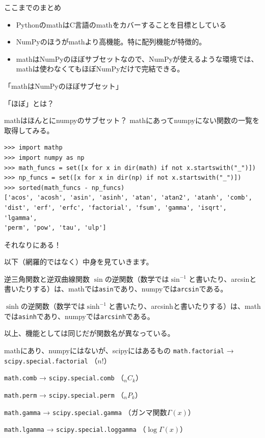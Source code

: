 \documentclass[unicode,lualatex,aspectratio=169]{beamer}
\begin{document}
\begin{frame}[fragile]{ここまでのまとめ}
  \begin{itemize}
  \item PythonのmathはC言語のmathをカバーすることを目標としている
  \item NumPyのほうがmathより高機能。特に配列機能が特徴的。
  \item mathはNumPyのほぼサブセットなので、NumPyが使えるような環境では、mathは使わなくてもほぼNumPyだけで完結できる。
  \end{itemize}
\end{frame}
\begin{frame}
  「mathはNumPyのほぼサブセット」

  
  「ほぼ」とは？
\end{frame}
\begin{frame}[fragile]{mathはほんとにnumpyのサブセット？}
mathにあってnumpyにない関数の一覧を取得してみる。
{\fontsize{6pt}{6pt}\selectfont    
\begin{verbatim}
>>> import mathp
>>> import numpy as np
>>> math_funcs = set([x for x in dir(math) if not x.startswith("_")])
>>> np_funcs = set([x for x in dir(np) if not x.startswith("_")])
>>> sorted(math_funcs - np_funcs)
['acos', 'acosh', 'asin', 'asinh', 'atan', 'atan2', 'atanh', 'comb', 
'dist', 'erf', 'erfc', 'factorial', 'fsum', 'gamma', 'isqrt', 'lgamma',
'perm', 'pow', 'tau', 'ulp']
\end{verbatim}
}
それなりにある！

以下（網羅的ではなく）中身を見ていきます。
\end{frame}
\begin{frame}[fragile]{逆三角関数と逆双曲線関数}
  $\sin$の逆関数（数学では$\sin^{-1}$と書いたり、arcsinと書いたりする）は、mathでは\verb|asin|であり、numpyでは\verb|arcsin|である。

  
  $\sinh$の逆関数（数学では$\sinh^{-1}$と書いたり、arcsinhと書いたりする）は、mathでは\verb|asinh|であり、numpyでは\verb|arcsinh|である。

  以上、機能としては同じだが関数名が異なっている。
\end{frame}
\begin{frame}[fragile]{mathにあり、numpyにはないが、scipyにはあるもの}
  \verb|math.factorial| → \verb|scipy.special.factorial| （$n!$）
  
  \verb|math.comb| → \verb|scipy.special.comb| （${}_n C_k$）
  
  \verb|math.perm| → \verb|scipy.special.perm| （${}_n P_k$）

  \verb|math.gamma| → \verb|scipy.special.gamma| （ガンマ関数$\Gamma(x)$）
  
  \verb|math.lgamma| → \verb|scipy.special.loggamma| （$\log \Gamma(x)$）
\end{frame}
\end{document}
